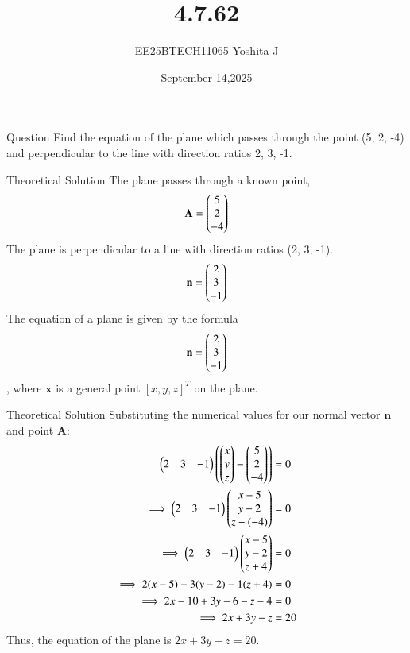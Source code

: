 \documentclass{beamer}
\begin{document}
\title 
{4.7.62}
\date{September 14,2025}


\author 
{EE25BTECH11065-Yoshita J}






\frame{\titlepage}
\begin{frame}{Question}
Find the equation of the plane which passes through the point (5, 2, -4) and perpendicular to the line with direction ratios 2, 3, -1.\\

\end{frame}


\begin{frame}{Theoretical Solution}
The plane passes through a known point,
\[ \mathbf{A} = \begin{pmatrix}5\\2\\-4\end{pmatrix} \]
The plane is perpendicular to a line with direction ratios (2, 3, -1). 
\[ \mathbf{n} = \begin{pmatrix}2\\3\\-1\end{pmatrix} \]
The equation of a plane is given by the formula \[ \mathbf{n} = \begin{pmatrix}2\\3\\-1\end{pmatrix} \], where $\mathbf{x}$ is a general point $[x, y, z]^T$ on the plane.
\end{frame}

\begin{frame}{Theoretical Solution}
Substituting the numerical values for our normal vector $\mathbf{n}$ and point $\mathbf{A}$:
\begin{align*}
    \begin{pmatrix}2 & 3 & -1\end{pmatrix} \left( \begin{pmatrix}x\\y\\z\end{pmatrix} - \begin{pmatrix}5\\2\\-4\end{pmatrix} \right) &= 0 \\
    \implies \begin{pmatrix}2 & 3 & -1\end{pmatrix} \begin{pmatrix}x-5\\y-2\\z-(-4)\end{pmatrix} &= 0 \\
    \implies \begin{pmatrix}2 & 3 & -1\end{pmatrix} \begin{pmatrix}x-5\\y-2\\z+4\end{pmatrix} &= 0 \\
    \implies 2(x-5) + 3(y-2) - 1(z+4) &= 0 \\
    \implies 2x - 10 + 3y - 6 - z - 4 &= 0 \\
    \implies 2x + 3y - z &= 20
\end{align*}
Thus, the equation of the plane is $2x + 3y - z = 20$.
\end{frame}
\end{document}
